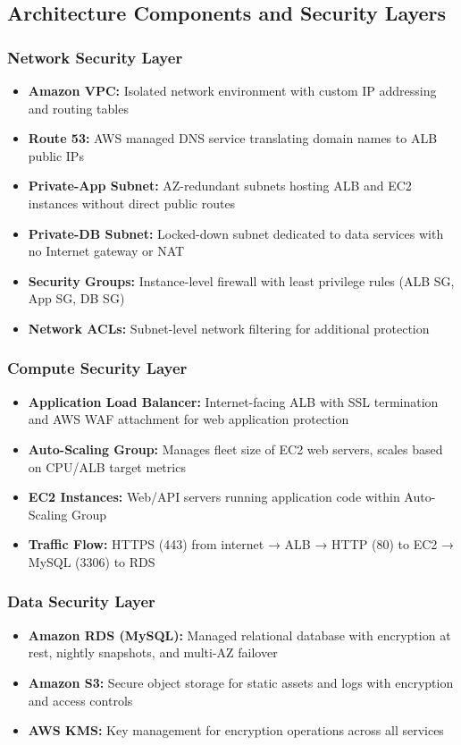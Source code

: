 \documentclass[12pt]{article}
\begin{document}
\subsection{Architecture Components and Security Layers}

\subsubsection{Network Security Layer}
\begin{itemize}
\item \textbf{Amazon VPC:} Isolated network environment with custom IP addressing and routing tables
\item \textbf{Route 53:} AWS managed DNS service translating domain names to ALB public IPs
\item \textbf{Private-App Subnet:} AZ-redundant subnets hosting ALB and EC2 instances without direct public routes
\item \textbf{Private-DB Subnet:} Locked-down subnet dedicated to data services with no Internet gateway or NAT
\item \textbf{Security Groups:} Instance-level firewall with least privilege rules (ALB SG, App SG, DB SG)
\item \textbf{Network ACLs:} Subnet-level network filtering for additional protection
\end{itemize}

\subsubsection{Compute Security Layer}
\begin{itemize}
\item \textbf{Application Load Balancer:} Internet-facing ALB with SSL termination and AWS WAF attachment for web application protection
\item \textbf{Auto-Scaling Group:} Manages fleet size of EC2 web servers, scales based on CPU/ALB target metrics
\item \textbf{EC2 Instances:} Web/API servers running application code within Auto-Scaling Group
\item \textbf{Traffic Flow:} HTTPS (443) from internet → ALB → HTTP (80) to EC2 → MySQL (3306) to RDS
\end{itemize}

\subsubsection{Data Security Layer}
\begin{itemize}
\item \textbf{Amazon RDS (MySQL):} Managed relational database with encryption at rest, nightly snapshots, and multi-AZ failover
\item \textbf{Amazon S3:} Secure object storage for static assets and logs with encryption and access controls
\item \textbf{AWS KMS:} Key management for encryption operations across all services
\end{itemize}
\end{document}
